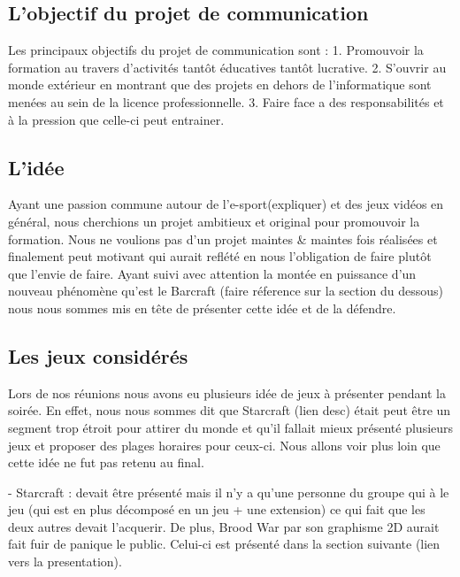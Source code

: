 \subsection{L'objectif du projet de communication}%
\label{sub:l_objectif_du_projet_de_communication}

Les principaux objectifs du projet de communication sont : 1. Promouvoir
la formation au travers d'activités tantôt éducatives tantôt lucrative.
2. S'ouvrir au monde extérieur en montrant que des projets en dehors de
l'informatique sont menées au sein de la licence professionnelle.  3.
Faire face a des responsabilités et à la pression que celle-ci peut
entrainer.

\subsection{L'idée}%
\label{sub:l_idee}

Ayant une passion commune autour de l'e-sport(expliquer) et des jeux
vidéos en général, nous cherchions un projet ambitieux et original
pour promouvoir la formation. Nous ne voulions pas d'un projet maintes
& maintes fois réalisées et finalement peut motivant qui aurait
reflété en nous l'obligation de faire plutôt que l'envie de faire.
Ayant suivi avec attention la montée en puissance d'un nouveau
phénomène qu'est le Barcraft (faire réference sur la section du
dessous) nous nous sommes mis en tête de présenter cette idée et de la
défendre.

\subsection{Les jeux considérés}%
\label{sub:les_jeux_consideres}

Lors de nos réunions nous avons eu plusieurs idée de jeux à présenter
pendant la soirée. En effet, nous nous sommes dit que Starcraft (lien
desc) était peut être un segment trop étroit pour attirer du monde et
qu'il fallait mieux présenté plusieurs jeux et proposer des plages
horaires pour ceux-ci. Nous allons voir plus loin que cette idée ne fut
pas retenu au final.

- Starcraft : devait être présenté mais il n'y a qu'une personne du
groupe qui à le jeu (qui est en plus décomposé en un jeu + une
extension) ce qui fait que les deux autres devait l'acquerir. De
plus, Brood War par son graphisme 2D aurait fait fuir de panique le
public. Celui-ci est présenté dans la section suivante (lien vers la
presentation).

